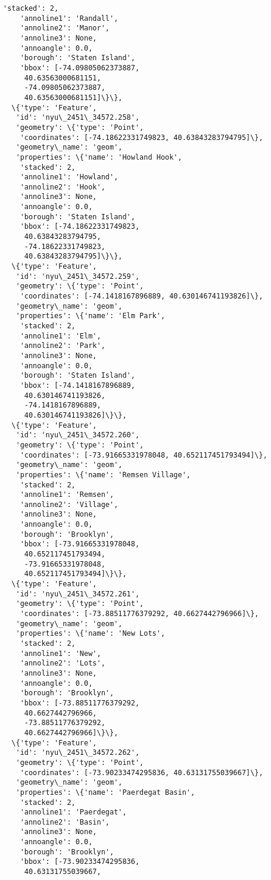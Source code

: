 \documentclass[11pt]{article}
\begin{document}
\begin{tcolorbox}[breakable, size=fbox, boxrule=.5pt, pad at break*=1mm, opacityfill=0]
\begin{Verbatim}[commandchars=\\\{\}]
    'stacked': 2,
    'annoline1': 'Randall',
    'annoline2': 'Manor',
    'annoline3': None,
    'annoangle': 0.0,
    'borough': 'Staten Island',
    'bbox': [-74.09805062373887,
     40.63563000681151,
     -74.09805062373887,
     40.63563000681151]\}\},
  \{'type': 'Feature',
   'id': 'nyu\_2451\_34572.258',
   'geometry': \{'type': 'Point',
    'coordinates': [-74.18622331749823, 40.63843283794795]\},
   'geometry\_name': 'geom',
   'properties': \{'name': 'Howland Hook',
    'stacked': 2,
    'annoline1': 'Howland',
    'annoline2': 'Hook',
    'annoline3': None,
    'annoangle': 0.0,
    'borough': 'Staten Island',
    'bbox': [-74.18622331749823,
     40.63843283794795,
     -74.18622331749823,
     40.63843283794795]\}\},
  \{'type': 'Feature',
   'id': 'nyu\_2451\_34572.259',
   'geometry': \{'type': 'Point',
    'coordinates': [-74.1418167896889, 40.630146741193826]\},
   'geometry\_name': 'geom',
   'properties': \{'name': 'Elm Park',
    'stacked': 2,
    'annoline1': 'Elm',
    'annoline2': 'Park',
    'annoline3': None,
    'annoangle': 0.0,
    'borough': 'Staten Island',
    'bbox': [-74.1418167896889,
     40.630146741193826,
     -74.1418167896889,
     40.630146741193826]\}\},
  \{'type': 'Feature',
   'id': 'nyu\_2451\_34572.260',
   'geometry': \{'type': 'Point',
    'coordinates': [-73.91665331978048, 40.652117451793494]\},
   'geometry\_name': 'geom',
   'properties': \{'name': 'Remsen Village',
    'stacked': 2,
    'annoline1': 'Remsen',
    'annoline2': 'Village',
    'annoline3': None,
    'annoangle': 0.0,
    'borough': 'Brooklyn',
    'bbox': [-73.91665331978048,
     40.652117451793494,
     -73.91665331978048,
     40.652117451793494]\}\},
  \{'type': 'Feature',
   'id': 'nyu\_2451\_34572.261',
   'geometry': \{'type': 'Point',
    'coordinates': [-73.88511776379292, 40.6627442796966]\},
   'geometry\_name': 'geom',
   'properties': \{'name': 'New Lots',
    'stacked': 2,
    'annoline1': 'New',
    'annoline2': 'Lots',
    'annoline3': None,
    'annoangle': 0.0,
    'borough': 'Brooklyn',
    'bbox': [-73.88511776379292,
     40.6627442796966,
     -73.88511776379292,
     40.6627442796966]\}\},
  \{'type': 'Feature',
   'id': 'nyu\_2451\_34572.262',
   'geometry': \{'type': 'Point',
    'coordinates': [-73.90233474295836, 40.63131755039667]\},
   'geometry\_name': 'geom',
   'properties': \{'name': 'Paerdegat Basin',
    'stacked': 2,
    'annoline1': 'Paerdegat',
    'annoline2': 'Basin',
    'annoline3': None,
    'annoangle': 0.0,
    'borough': 'Brooklyn',
    'bbox': [-73.90233474295836,
     40.63131755039667,

\end{Verbatim}
\end{tcolorbox}
\end{document}
